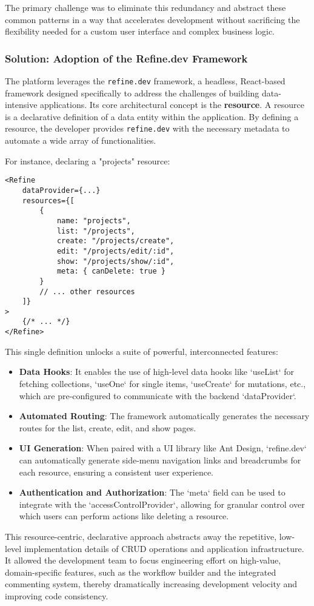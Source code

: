 The primary challenge was to eliminate this redundancy and abstract these common patterns in a way that accelerates development without sacrificing the flexibility needed for a custom user interface and complex business logic.

\subsubsection{Solution: Adoption of the Refine.dev Framework}
The platform leverages the \texttt{refine.dev} framework, a headless, React-based framework designed specifically to address the challenges of building data-intensive applications. Its core architectural concept is the \textbf{resource}. A resource is a declarative definition of a data entity within the application. By defining a resource, the developer provides \texttt{refine.dev} with the necessary metadata to automate a wide array of functionalities.

For instance, declaring a "projects" resource:
\begin{verbatim}
<Refine
    dataProvider={...}
    resources={[
        {
            name: "projects",
            list: "/projects",
            create: "/projects/create",
            edit: "/projects/edit/:id",
            show: "/projects/show/:id",
            meta: { canDelete: true }
        }
        // ... other resources
    ]}
>
    {/* ... */}
</Refine>
\end{verbatim}
This single definition unlocks a suite of powerful, interconnected features:
\begin{itemize}
    \item \textbf{Data Hooks}: It enables the use of high-level data hooks like `useList` for fetching collections, `useOne` for single items, `useCreate` for mutations, etc., which are pre-configured to communicate with the backend `dataProvider`.
    \item \textbf{Automated Routing}: The framework automatically generates the necessary routes for the list, create, edit, and show pages.
    \item \textbf{UI Generation}: When paired with a UI library like Ant Design, `refine.dev` can automatically generate side-menu navigation links and breadcrumbs for each resource, ensuring a consistent user experience.
    \item \textbf{Authentication and Authorization}: The `meta` field can be used to integrate with the `accessControlProvider`, allowing for granular control over which users can perform actions like deleting a resource.
\end{itemize}
This resource-centric, declarative approach abstracts away the repetitive, low-level implementation details of CRUD operations and application infrastructure. It allowed the development team to focus engineering effort on high-value, domain-specific features, such as the workflow builder and the integrated commenting system, thereby dramatically increasing development velocity and improving code consistency.

